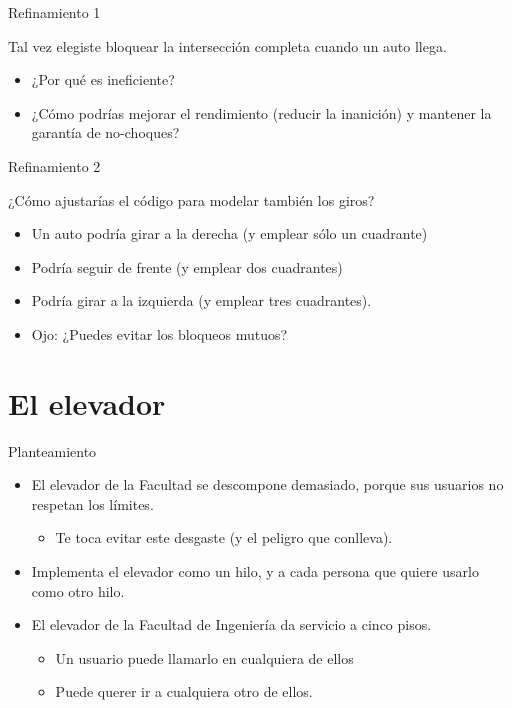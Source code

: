 \documentclass[presentation]{beamer}
\begin{document}
\begin{frame}[label={sec:org2b79d88}]{Refinamiento 1}
\begin{center}
Tal vez elegiste bloquear la intersección completa cuando un auto
llega.
\end{center}

\begin{itemize}
\item ¿Por qué es ineficiente?
\item ¿Cómo podrías mejorar el rendimiento (reducir la inanición) y
mantener la garantía de no-choques?
\end{itemize}
\end{frame}

\begin{frame}[label={sec:org8710bde}]{Refinamiento 2}
\begin{center}
¿Cómo ajustarías el código para modelar también los giros?
\end{center}
\begin{itemize}
\item Un auto podría girar a la derecha (y emplear sólo un cuadrante)
\item Podría seguir de frente (y emplear dos cuadrantes)
\item Podría girar a la izquierda (y emplear tres cuadrantes).
\item Ojo: ¿Puedes evitar los bloqueos mutuos?
\end{itemize}
\end{frame}

\section{El elevador}
\label{sec:org677cf76}
\begin{frame}[label={sec:org3fd955c}]{Planteamiento}
\begin{itemize}
\item El elevador de la Facultad se descompone demasiado, porque sus
usuarios no respetan los límites.
\begin{itemize}
\item Te toca evitar este desgaste (y el peligro que conlleva).
\end{itemize}
\item Implementa el elevador como un hilo, y a cada persona que quiere
usarlo como otro hilo.
\item El elevador de la Facultad de Ingeniería da servicio a cinco
pisos.
\begin{itemize}
\item Un usuario puede llamarlo en cualquiera de ellos
\item Puede querer ir a cualquiera otro de ellos.
\end{itemize}
\end{itemize}
\end{frame}
\end{document}
